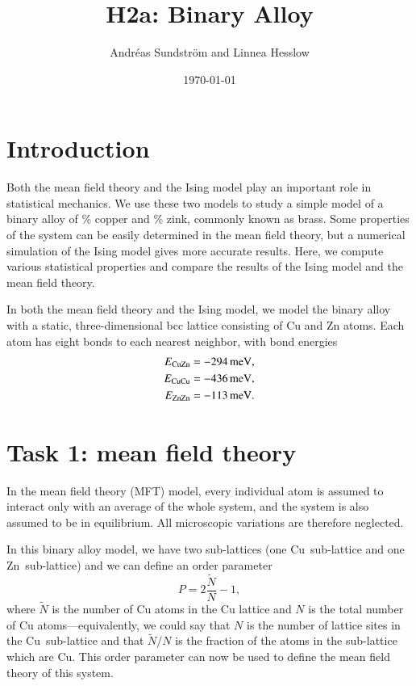 
\usepackage{units}
\usepackage{physics}

\newcommand{\ee}{\mathrm{e}}
\newcommand{\ii}{\mathrm{i}}
\newcommand{\kB}{k_\mathrm{B}}
\newcommand{\MFT}{\text{MFT}}

\title{H2a: Binary Alloy}
\author{Andr\'eas Sundstr\"om and Linnea Hesslow}
\date{\today}





\section*{Introduction}
Both the mean field theory and the Ising model play an important role in statistical mechanics. We use these two models to study a simple model of a binary alloy of \unit[50]{\%} copper and \unit[50]{\%} zink, commonly known as brass. Some properties of the system can be easily determined in the mean field theory, but a numerical simulation of the Ising model gives more accurate results. Here, we compute various statistical properties and compare the results of the Ising model and the mean field theory.


In both the mean field theory and the Ising model, we model the binary alloy with a static, three-dimensional  bcc lattice  consisting of Cu and Zn atoms. Each atom has eight bonds to each nearest neighbor, with bond energies
\begin{equation}
\begin{aligned}
E_{\rm CuZn} &= \unit[-294]{meV}, \\
E_{\rm CuCu} &= \unit[-436]{meV}, \\
E_{\rm ZnZn} &= \unit[-113]{meV}.
\end{aligned}
\label{eq:energies}
\end{equation}

\section*{Task 1: mean field theory}
In the mean field theory (MFT) model, every individual atom is assumed
to interact only with an average of the whole system, and the system
is also assumed to be in equilibrium. All microscopic
variations are therefore neglected.

In this binary alloy model, we have two sub-lattices (one
Cu~sub-lattice and one Zn~sub-lattice) and we can define an order
parameter
\begin{equation}
P=2\frac{\tilde{N}}{N}-1,
\end{equation}
where $\tilde{N}$ is the number of Cu atoms in the Cu lattice and $N$
is the total number of Cu atoms---equivalently, we could say that $N$
is the number of lattice sites in the Cu~sub-lattice and that
$\tilde{N}/N$ is the fraction of the atoms in the sub-lattice which
are Cu. This order parameter can now be used to define the mean field
theory of this system.

